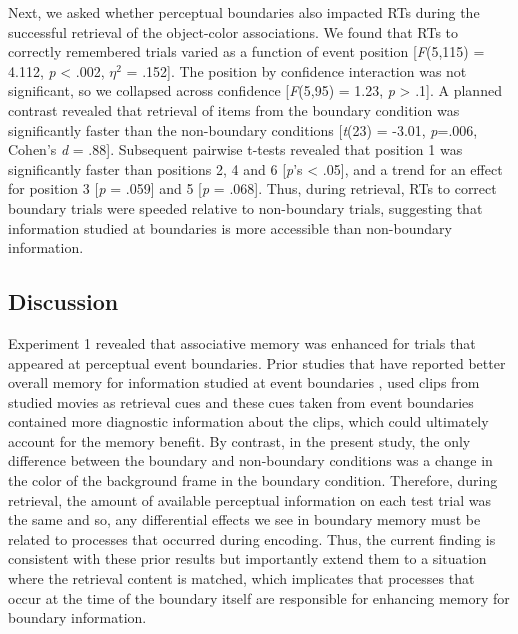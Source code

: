 Next, we asked whether perceptual boundaries also impacted RTs during
the successful retrieval of the object-color associations. We found that
RTs to correctly remembered trials varied as a function of event
position {[}\emph{F}(5,115) = 4.112, \emph{p} \textless{} .002,
\(\eta^{2}\) = .152{]}. The position by confidence interaction was not
significant, so we collapsed across confidence {[}\emph{F}(5,95) = 1.23,
\emph{p} \textgreater{} .1{]}. A planned contrast revealed that
retrieval of items from the boundary condition was significantly faster
than the non-boundary conditions {[}\emph{t}(23) = -3.01, \emph{p}=.006,
Cohen's \emph{d} = .88{]}. Subsequent pairwise t-tests revealed that
position 1 was significantly faster than positions 2, 4 and 6
{[}\emph{p}'s \textless{} .05{]}, and a trend for an effect for position
3 {[}\emph{p} = .059{]} and 5 {[}\emph{p} = .068{]}. Thus, during
retrieval, RTs to correct boundary trials were speeded relative to
non-boundary trials, suggesting that information studied at boundaries
is more accessible than non-boundary information.

\subsection{Discussion}\label{discussion}

Experiment 1 revealed that associative memory was enhanced for trials
that appeared at perceptual event boundaries. Prior studies that have
reported better overall memory for information studied at event
boundaries
\autocites{boltz_temporal_1992}{newtson_perceptual_1976}{schwan_cognitive_2004},
used clips from studied movies as retrieval cues and these cues taken
from event boundaries contained more diagnostic information about the
clips, which could ultimately account for the memory benefit. By
contrast, in the present study, the only difference between the boundary
and non-boundary conditions was a change in the color of the background
frame in the boundary condition. Therefore, during retrieval, the amount
of available perceptual information on each test trial was the same and
so, any differential effects we see in boundary memory must be related
to processes that occurred during encoding. Thus, the current finding is
consistent with these prior results but importantly extend them to a
situation where the retrieval content is matched, which implicates that
processes that occur at the time of the boundary itself are responsible
for enhancing memory for boundary information.

